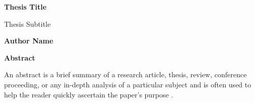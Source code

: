 \thispagestyle{plain}
    \Large
    \textbf{Thesis Title}
        
    \vspace{0.4cm}
    \large
    Thesis Subtitle
        
    \vspace{0.4cm}
    \textbf{Author Name}
       
    \vspace{0.9cm}
    \begin{center}
        \textbf{Abstract}
        \begin{displayquote}
        An abstract is a brief summary of a research article, thesis, review, conference proceeding, or any in-depth analysis of a particular subject and is often used to help the reader quickly ascertain the paper's purpose \parencite{wikipedia-abstract}.
        \end{displayquote}
    \end{center}
